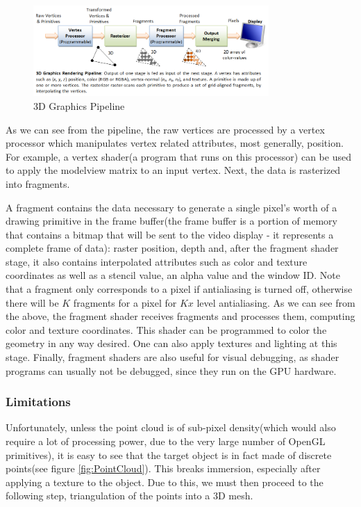 \documentclass[]{article}
\begin{document}
\begin{figure}[hbtp]
    \centering
    \includegraphics[width=0.8\textwidth]{figures/Graphics3D_Pipe.png}
    \caption{3D Graphics Pipeline}
    \label{fig:GraphicsPipeline}
\end{figure}

As we can see from the pipeline, the raw vertices are processed by a vertex processor which manipulates vertex related attributes, most generally, position. For example, a vertex shader(a program that runs on this processor) can be used to apply the modelview matrix to an input vertex. Next, the data is rasterized into fragments.
 
A fragment contains the data necessary to generate a single pixel's worth of a drawing primitive in the frame buffer(the frame buffer is a portion of memory that contains a bitmap that will be sent to the video display - it represents a complete frame of data): raster position, depth and, after the fragment shader stage, it also contains interpolated attributes such as color and texture coordinates as well as a stencil value, an alpha value and the window ID. Note that a fragment only corresponds to a pixel if antialiasing is turned off, otherwise there will be $K$ fragments for a pixel for $Kx$ level antialiasing.
As we can see from the above, the fragment shader receives fragments and processes them, computing color and texture coordinates. This shader can be programmed to color the geometry in any way desired. One can also apply textures and lighting at this stage. Finally, fragment shaders are also useful for visual debugging, as shader programs can usually not be debugged, since they run on the GPU hardware.\\

\subsubsection{Limitations}

Unfortunately, unless the point cloud is of sub-pixel density(which would also require a lot of processing power, due to the very large number of OpenGL primitives), it is easy to see that the target object is in fact made of discrete points(see figure \ref{fig:PointCloud}). This breaks immersion, especially after applying a texture to the object. Due to this, we must then proceed to the following step, triangulation of the points into a 3D mesh.
\end{document}
